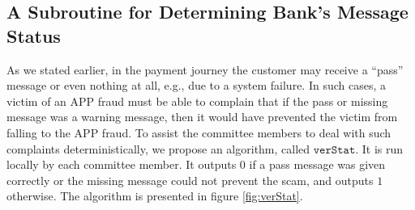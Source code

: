 

\subsection{A Subroutine for Determining Bank's Message Status}

As we stated earlier, in the payment journey the customer may receive a ``pass'' message or even nothing at all, e.g., due to a system failure. In such cases,  a victim of  an APP fraud must be able to complain that if the pass or missing message was   a warning message, then it   would have prevented the victim from falling to the APP fraud. To assist the committee members to deal with  such complaints deterministically, we propose an algorithm,  called $\mathtt{verStat}$. It is run locally by each committee member. It outputs $0$ if a pass message was given correctly or the missing message could not  prevent the scam, and outputs $1$ otherwise. The algorithm is presented in figure \ref{fig:verStat}.


